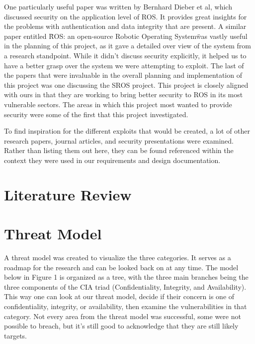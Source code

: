 \documentclass[IEEEtran,letterpaper,10pt,notitlepage,draftclsnofoot,onecolumn]{article}
\begin{document}
One particularly useful paper was written by Bernhard Dieber et al, which discussed security on the application level of ROS.
It provides great insights for the problems with authentication and data integrity that are present. \cite{App}
A similar paper entitled \"ROS: an open-source Robotic Operating System\" was vastly useful in the planning of this project, as it gave a detailed over view of the system from a research standpoint.
While it didn't discuss security explicitly, it helped us to have a better grasp over the system we were attempting to exploit. \cite{Open}
The last of the papers that were invaluable in the overall planning and implementation of this project was one discussing the SROS project.
This project is closely aligned with ours in that they are working to bring better security to ROS in its most vulnerable sectors.
The areas in which this project most wanted to provide security were some of the first that this project investigated. \cite{Sros}

To find inspiration for the different exploits that would be created, a lot of other research papers, journal articles, and security presentations were examined.
Rather than listing them out here, they can be found referenced within the context they were used in our requirements and design documentation.

\section{Literature Review}

\section{Threat Model}
A threat model was created to visualize the three categories. It serves as a roadmap for the research and can be looked back on at any time.
The model below in Figure 1 is organized as a tree, with the three main branches being the three components of the CIA triad (Confidentiality, Integrity, and Availability).
This way one can look at our threat model, decide if their concern is one of confidentiality, integrity, or availability, then examine the vulnerabilities in that category.
Not every area from the threat model was successful, some were not possible to breach, but it’s still good to acknowledge that they are still likely targets.
\end{document}
